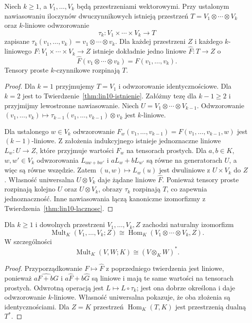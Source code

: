 \begin{twierdzenie}
\label{thm:lin10-wielokrotny}
Niech \(k\geq1\), a
\(V_1,\ldots,V_k\) będą
przestrzeniami wektorowymi.
Przy ustalonym nawiasowaniu
iloczynów dwuczynnikowych
istnieją przestrzeń
\(T=V_1\otimes\cdots\otimes V_k\)
oraz \(k\)-liniowe odwzorowanie
\[
 \tau_k\colon V_1\times\cdots\times V_k
       \longrightarrow T
\]
zapisane
\(\tau_k(v_1,\ldots,v_k)
=v_1\otimes\cdots\otimes v_k\).
Dla każdej przestrzeni \(Z\)
i każdego \(k\)-liniowego
\(F\colon V_1\times\cdots\times V_k\to Z\)
istnieje dokładnie jedno
liniowe \(\widehat F\colon T\to Z\)
o
\[
 \widehat F(v_1\otimes\cdots\otimes v_k)
 =F(v_1,\ldots,v_k).
\]
Tensory proste \(k\)-czynnikowe
rozpinają \(T\).
\end{twierdzenie}
\begin{proof}
Dla \(k=1\) przyjmujemy
\(T=V_1\) i odwzorowanie
identycznościowe.
Dla \(k=2\) jest to
Twierdzenie~\ref{thm:lin10-istnienie}.
Załóżmy tezę dla \(k-1\geq2\)
i przyjmijmy lewostronne nawiasowanie.
Niech \(U=V_1\otimes\cdots\otimes V_{k-1}\).
Odwzorowanie
\((v_1,\ldots,v_k)\mapsto
\tau_{k-1}(v_1,\ldots,v_{k-1})
\otimes v_k\)
jest \(k\)-liniowe.

Dla ustalonego \(w\in V_k\)
odwzorowanie
\(F_w(v_1,\ldots,v_{k-1})
=F(v_1,\ldots,v_{k-1},w)\)
jest \((k-1)\)-liniowe.
Z założenia indukcyjnego
istnieje jednoznaczne liniowe
\(L_w\colon U\to Z\),
które przyjmuje wartości \(F_w\)
na tensorach prostych.
Dla \(a,b\in K\), \(w,w'\in V_k\)
odwzorowania
\(L_{aw+bw'}\) i
\(aL_w+bL_{w'}\)
są równe na generatorach \(U\),
a więc są równe wszędzie.
Zatem \((u,w)\mapsto L_w(u)\)
jest dwuliniowe z \(U\times V_k\) do \(Z\).
Własność uniwersalna \(U\otimes V_k\)
daje żądane liniowe \(\widehat F\).
Ponieważ tensory proste
rozpinają kolejno \(U\)
oraz \(U\otimes V_k\),
obrazy \(\tau_k\) rozpinają \(T\),
co zapewnia jednoznaczność.
Inne nawiasowania łączą
kanoniczne izomorfizmy
z
Twierdzenia~\ref{thm:lin10-lacznosc}.
\end{proof}

\begin{wniosek}
\label{cor:lin10-linearyzacja}
Dla \(k\geq1\) i dowolnych
przestrzeni \(V_1,\ldots,V_k,Z\)
zachodzi naturalny izomorfizm
\[
 \operatorname{Mult}_K(V_1,\ldots,V_k;Z)
 \cong
 \operatorname{Hom}_K(
 V_1\otimes\cdots\otimes V_k,Z).
\]
W szczególności
\[
 \operatorname{Mult}_K(V,W;K)
 \cong(V\otimes_KW)^*.
\]
\end{wniosek}
\begin{proof}
Przyporządkowanie
\(F\mapsto\widehat F\)
z poprzedniego twierdzenia
jest liniowe, ponieważ
\(\widehat{aF+bG}\) i
\(a\widehat F+b\widehat G\)
są liniowe i mają te same
wartości na tensorach prostych.
Odwrotną operacją jest
\(L\mapsto L\circ\tau_k\);
jest ona dobrze określona
i daje odwzorowanie \(k\)-liniowe.
Własność uniwersalna pokazuje,
że oba złożenia są identycznościami.
Dla \(Z=K\) przestrzeń
\(\operatorname{Hom}_K(T,K)\)
jest przestrzenią dualną \(T^*\).
\end{proof}

